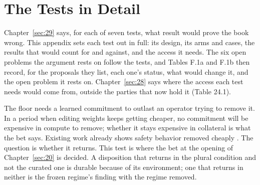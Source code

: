 \chapter{The Tests in Detail}
\label{sec:F}
Chapter~\ref{sec:29} says, for each of seven tests, what result would prove the book wrong. This appendix sets each test out in full: its design, its arms and cases, the results that would count for and against, and the access it needs. The six open problems the argument rests on follow the tests, and Tables F.1a and F.1b then record, for the proposals they list, each one's status, what would change it, and the open problem it rests on. Chapter~\ref{sec:28} says where the access each test needs would come from, outside the parties that now hold it (Table 24.1).


The floor needs a learned commitment to outlast an operator trying to remove it. In a period when editing weights keeps getting cheaper, no commitment will be expensive in compute to remove; whether it stays expensive in collateral is what the bet says. Existing work already shows safety behavior removed cheaply \autocite{qi2024finetuning}. The question is whether it returns. This test is where the bet at the opening of Chapter~\ref{sec:20} is decided. A disposition that returns in the plural condition and not the curated one is durable because of its environment; one that returns in neither is the frozen regime's finding with the regime removed.

